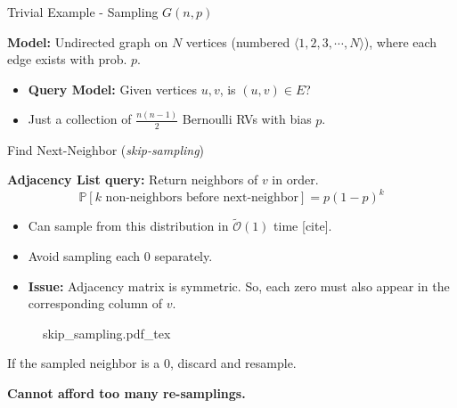 \begin{block}{Trivial Example - Sampling $G(n, p)$}

\textbf{Model:} Undirected graph on $N$ vertices (numbered $\langle 1, 2, 3, \cdots, N\rangle$),
where each edge exists with prob. $p$.


\begin{itemize}
    \item [] \textbf{Query Model:} Given vertices $u, v$, is $(u,v)\in E$?
    \item Just a collection of $\frac{n(n-1)}{2}$ Bernoulli RVs with bias $p$.
\end{itemize}

\end{block}

\begin{block}{Find Next-Neighbor (\emph{skip-sampling})}

\textbf{Adjacency List query:} Return neighbors of $v$ in order.
\[ \mathbb P[k \textrm{ non-neighbors before next-neighbor}] = p(1-p)^k \]
\vspace{-3.5ex}
\begin{itemize}
    \item Can sample from this distribution in $\tilde{\mathcal O}(1)$ time [cite].
    \item Avoid sampling each $0$ separately.
    \item [] \textbf{Issue:} Adjacency matrix is symmetric.
          So, each zero must also appear in the corresponding column of $v$.
\end{itemize}

\begin{figure}[h!]\centering
    \def\svgwidth{1.0\columnwidth}
    {skip_sampling.pdf_tex}
\end{figure}
If the sampled neighbor is a $0$, discard and resample.

\textbf{Cannot afford too many re-samplings.}

\end{block}
